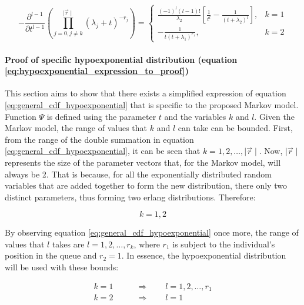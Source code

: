 \begin{equation} \label{eq:hypoexponential_expression_to_proof}
    - \frac{\partial^{l - 1}}{\partial t ^{l - 1}}
    \left(
        \prod_{j = 0, j \neq k}^{\mid \vec{r} \mid} (\lambda_j + t)^{-r_j}
    \right) =
    \begin{cases}
        \frac{(-1)^{l} (l-1)!}{\lambda_2} \left[\frac{1}{t^l} - \frac{1}
        {(t + \lambda_2)^l}\right] , & k=1 \\
        - \frac{1}{t (t + \lambda_1)^{r_1}}, & k=2
    \end{cases}
\end{equation}



\paragraph{Proof of specific hypoexponential distribution
(equation \ref{eq:hypoexponential_expression_to_proof})}

This section aims to show that there exists a simplified expression of equation
\ref{eq:general_cdf_hypoexponential} that is specific to the proposed Markov
model.
Function \(\Psi\) is defined using the parameter \(t\) and the variables \(k\)
and \(l\).
Given the Markov model, the range of values that \(k\) and \(l\) can take can be
bounded.
First, from the range of the double summation in equation
\ref{eq:general_cdf_hypoexponential}, it can be seen that
\(k = 1, 2, \dots, \mid \vec{r} \mid\).
Now, \(\mid \vec{r} \mid\) represents the size of the parameter vectors that,
for the Markov model, will always be 2.
That is because, for all the exponentially distributed random variables that are
added together to form the new distribution, there only two distinct parameters,
thus forming two erlang distributions. Therefore:

\begin{equation*}
    k = 1, 2
\end{equation*}

By observing equation \ref{eq:general_cdf_hypoexponential} once more, the range
of values that \(l\) takes are \(l = 1, 2, \dots, r_k\), where \(r_1\) is
subject to the individual's position in the queue and \(r_2 = 1\).
In essence, the hypoexponential distribution will be used with these bounds:

\begin{align}
    k = 1 & \qquad \Rightarrow \qquad l = 1, 2, \dots, r_1 \nonumber \\
    k = 2 & \qquad \Rightarrow \qquad l = 1
\end{align}

